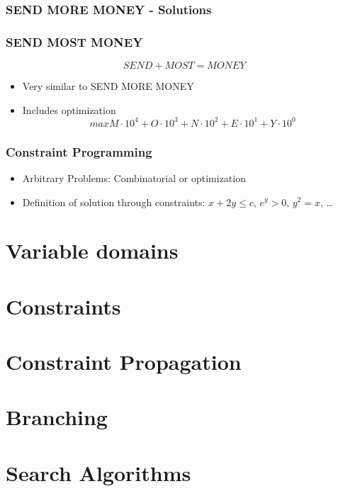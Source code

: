 \documentclass[hyperref={pdfpagelabels=false}]{beamer}
\begin{document}
\begin{frame}
	\frametitle{SEND MORE MONEY - Solutions}
\end{frame}

\begin{frame}
	\frametitle{SEND MOST MONEY}
	\[SEND + MOST = MONEY\]
	\begin{itemize}
		\item Very similar to SEND MORE MONEY
		\item Includes optimization
			\[max M \cdot 10^4 + O \cdot 10^3 + N \cdot 10^2 + E \cdot 10^1 + Y \cdot 10^0\]
	\end{itemize}
\end{frame}

\begin{frame}
	\frametitle{Constraint Programming}
	\begin{itemize}
		\item Arbitrary Problems: Combinatorial or optimization
		\item Definition of solution through constraints: $x + 2y \le c$, $e^y > 0$, $y^2 = x$, \dots
	\end{itemize}
\end{frame}

\section{Variable domains}
\begin{frame}
\end{frame}

\section{Constraints}
\begin{frame}
\end{frame}

\section{Constraint Propagation}
\begin{frame}
\end{frame}

\section{Branching}
\begin{frame}
\end{frame}

\section{Search Algorithms}
\begin{frame}
\end{frame}
\end{document}
